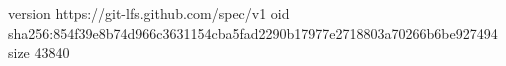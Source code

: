 version https://git-lfs.github.com/spec/v1
oid sha256:854f39e8b74d966c3631154cba5fad2290b17977e2718803a70266b6be927494
size 43840
